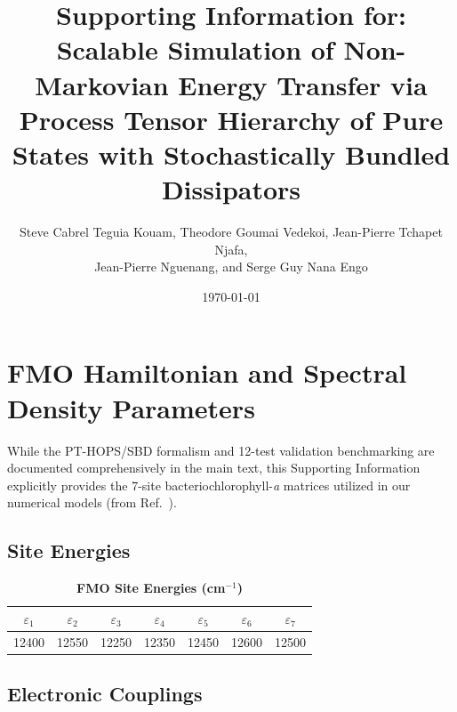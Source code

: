 \documentclass[11pt,a4paper]{article}
\begin{document}
\title{\textbf{Supporting Information for:\\Scalable Simulation of Non-Markovian Energy Transfer via Process Tensor Hierarchy of Pure States with Stochastically Bundled Dissipators}}

\author{Steve Cabrel Teguia Kouam, Theodore Goumai Vedekoi, Jean-Pierre Tchapet Njafa,\\ Jean-Pierre Nguenang, and Serge Guy Nana Engo}

\date{\today}
\maketitle

\section{FMO Hamiltonian and Spectral Density Parameters}

While the PT-HOPS/SBD formalism and 12-test validation benchmarking are documented comprehensively in the main text, this Supporting Information explicitly provides the 7-site bacteriochlorophyll-\textit{a} matrices utilized in our numerical models (from Ref.\ \cite{Adolphs2006}).

\subsection{Site Energies}

\begin{table}[h]
\centering
\caption{\textbf{FMO Site Energies (cm$^{-1}$)}}
\label{tab:SI_site_energies}
\begin{tabular}{ccccccc}
\toprule
$\varepsilon_1$ & $\varepsilon_2$ & $\varepsilon_3$ & $\varepsilon_4$ & $\varepsilon_5$ & $\varepsilon_6$ & $\varepsilon_7$ \\
\midrule
12400 & 12550 & 12250 & 12350 & 12450 & 12600 & 12500 \\
\bottomrule
\end{tabular}
\end{table}

\subsection{Electronic Couplings}
\end{document}
